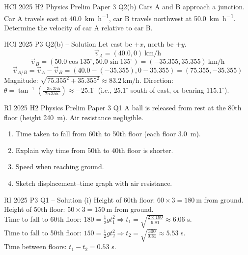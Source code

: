 \documentclass{beamer}
\begin{document}
\begin{frame}[t,shrink=15]{HCI 2025 H2 Physics Prelim Paper 3 Q2(b)}
Cars A and B approach a junction. Car A travels east at \SI{40.0}{\km\per\hour}, car B travels northwest at \SI{50.0}{\km\per\hour}. Determine the velocity of car A relative to car B.
\end{frame}

\begin{frame}[shrink=15]{HCI 2025 P3 Q2(b) – Solution}
Let east be $+x$, north be $+y$. 
\[ \vec{v}_A = (40.0, 0) \ \text{km/h} \]
\[ \vec{v}_B = (50.0\cos135^\circ, 50.0\sin135^\circ) = (-35.355, 35.355) \ \text{km/h} \]
\[ \vec{v}_{A/B} = \vec{v}_A - \vec{v}_B = (40.0 - (-35.355), 0 - 35.355) = (75.355, -35.355) \]
Magnitude: $\sqrt{75.355^2 + 35.355^2} \approx \SI{83.2}{\km\per\hour}$.
Direction: $\theta = \tan^{-1}\left(\frac{-35.355}{75.355}\right) \approx -25.1^\circ$ (i.e., $25.1^\circ$ south of east, or bearing $115.1^\circ$).
\end{frame}

\begin{frame}[t,shrink=15]{RI 2025 H2 Physics Prelim Paper 3 Q1}
A ball is released from rest at the 80th floor (height \SI{240}{\m}). Air resistance negligible.
\begin{enumerate}
    \item[(a)(i)] Time taken to fall from 60th to 50th floor (each floor \SI{3.0}{\m}).
    \item[(a)(ii)] Explain why time from 50th to 40th floor is shorter.
    \item[(a)(iii)] Speed when reaching ground.
    \item[(b)] Sketch displacement–time graph with air resistance.
\end{enumerate}
\end{frame}

\begin{frame}[shrink=15]{RI 2025 P3 Q1 – Solution (i)}
Height of 60th floor: $60 \times 3 = \SI{180}{\m}$ from ground. \\
Height of 50th floor: $50 \times 3 = \SI{150}{\m}$ from ground. \\
Time to fall to 60th floor: $180 = \frac12 g t_1^2 \Rightarrow t_1 = \sqrt{\frac{2\times180}{9.81}} \approx 6.06$ s. \\
Time to fall to 50th floor: $150 = \frac12 g t_2^2 \Rightarrow t_2 = \sqrt{\frac{300}{9.81}} \approx 5.53$ s. \\
Time between floors: $t_1 - t_2 = 0.53$ s.
\end{frame}
\end{document}
